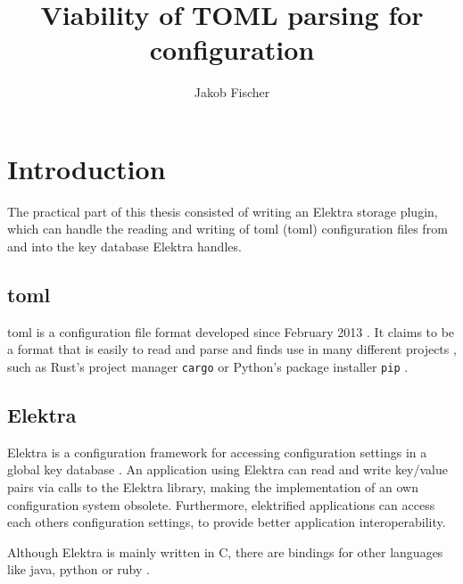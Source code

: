 \documentclass[draft,final]{vutinfth} %
\title{Viability of TOML parsing for configuration}
\author{Jakob Fischer}
\begin{document}
\frontmatter

\addstatementpage

\begin{acknowledgements*}
\end{acknowledgements*}

\begin{kurzfassung}
\end{kurzfassung}


\begin{abstract}
\end{abstract}


\tableofcontents

\mainmatter

\chapter{Introduction}

The practical part of this thesis consisted of writing an Elektra storage plugin, which can handle the reading and writing of \acrshort{toml} (\acrlong{toml}) configuration files from and into the key database Elektra handles.

\section{\acrshort{toml}}
\acrlong{toml} is a configuration file format developed since February 2013 \cite{tomlcontrib}.
It claims to be a format that is easily to read and parse \cite{tomlreadme} and finds use in many different projects \cite{tomlwiki}, such as Rust's project manager \texttt{cargo} \cite{cargogit} or Python's package installer \texttt{pip} \cite{piprefguide}.

\section{Elektra}
Elektra is a configuration framework for accessing configuration settings in a global key database \cite{elektramain}.
An application using Elektra can read and write key/value pairs via calls to the Elektra library, making the implementation of an own configuration system obsolete.
Furthermore, elektrified applications can access each others configuration settings, to provide better application interoperability.

Although Elektra is mainly written in C, there are bindings for other languages like java, python or ruby \cite{elektrabindings}.
\end{document}
